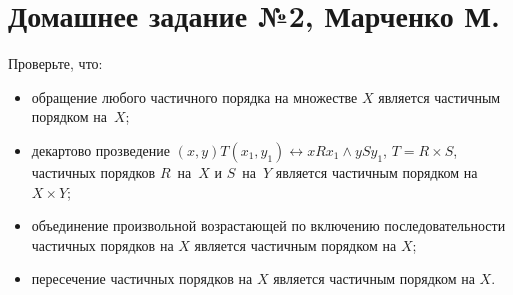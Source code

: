 


    \section*{Домашнее задание №2, Марченко М.}

    \begin{problem}[1]
        Проверьте, что:
        \begin{itemize}
            \item обращение любого частичного порядка на множестве \(X\) является частичным порядком на~\(X\);
            \item декартово прозведение \((x, y) T (x_1, y_1) \leftrightarrow x R x_1 \land y S y_1\), \(T = R \times S\), частичных порядков \(R\)~на~\(X\) и \(S\)~на~\(Y\) является частичным порядком на \(X \times Y\);
            \item объединение произвольной возрастающей по включению последовательности частичных порядков на \(X\) является частичным порядком на \(X\);
            \item пересечение частичных порядков на \(X\) является частичным порядком на \(X\).
        \end{itemize}
    \end{problem}
